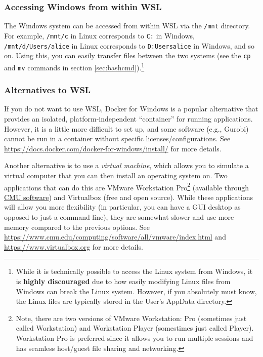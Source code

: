 \documentclass[12pt]{article}
\begin{document}
\subsubsection{Accessing Windows from within WSL}
The Windows system can be accessed from within WSL via the \texttt{/mnt} directory.
For example, \texttt{/mnt/c} in Linux corresponds to \texttt{C:} in Windows, \texttt{/mnt/d/Users/alice} in Linux corresponds to \texttt{D:Usersalice} in Windows, and so on.
Using this, you can easily transfer files between the two systems (see the \texttt{cp} and \texttt{mv} commands in section \ref{sec:bashcmd}).\footnote{
    While it is technically possible to access the Linux system from Windows, it is \textbf{highly discouraged} due to how easily modifying Linux files from Windows can break the Linux system.
    However, if you absolutely must know, the Linux files are typically stored in the User's AppData directory.
}

\subsubsection{Alternatives to WSL}
If you do not want to use WSL, Docker for Windows is a popular alternative that provides an isolated, platform-independent ``container'' for running applications.
However, it is a little more difficult to set up, and some software (e.g., Gurobi) cannot be run in a container without specific licenses/configurations.
See \url{https://docs.docker.com/docker-for-windows/install/} for more details.

Another alternative is to use a \emph{virtual machine}, which allows you to simulate a virtual computer that you can then install an operating system on.
Two applications that can do this are VMware Workstation Pro\footnote{
    Note, there are two versions of VMware Workstation: Pro (sometimes just called Workstation) and Workstation Player (somestimes just called Player).
    Workstation Pro is preferred since it allows you to run multiple sessions and has seamless host/guest file sharing and networking.}
(available through \href{https://www.cmu.edu/computing/software}{CMU software}) and Virtualbox (free and open source).
While these applications will allow you more flexibility (in particular, you can have a GUI desktop as opposed to just a command line), they are somewhat slower and use more memory compared to the previous options.
See \url{https://www.cmu.edu/computing/software/all/vmware/index.html} and \url{https://www.virtualbox.org} for more details.
\end{document}
